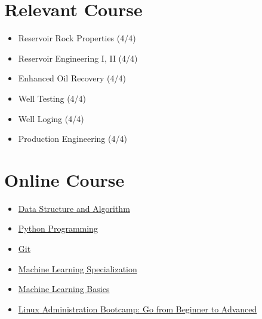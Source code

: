 \documentclass[a4paper, 11pt, sans]{article}
\newcommand*{\authorimg}[1]{%
	\raisebox{-.3\baselineskip}{%
		\texttt{[image: \#1]}%
	}%
}
\begin{document}
\section{Relevant Course}
	\begin{multicols}{3}
		\begin{itemize}[itemsep=-1pt, parsep=4pt]
			\item\small Reservoir Rock Properties (4/4)
			\item Reservoir Engineering I, II (4/4)
			\item Enhanced Oil Recovery (4/4)
			\item Well Testing (4/4)
			\item Well Loging (4/4)
			\item Production Engineering (4/4)
		\end{itemize}
	\end{multicols}


	
\section{Online Course}
\begin{multicols}{2}
	\begin{itemize}[itemsep=-1pt, parsep=4pt]
		\item\small \authorimg{images/ds-algorithm.png} \href{https://maktabkhooneh.org/course/189-%D8%B7%D8%B1%D8%A7%D8%AD%DB%8C-%D8%A7%D9%84%DA%AF%D9%88%D8%B1%DB%8C%D8%AA%D9%85-mk189/}{Data Structure and Algorithm}
		\item \authorimg{images/python.png} \href{https://www.pytopia.ai/course/python}{Python Programming}
		\item \authorimg{images/git.png} \href{https://www.pytopia.ai/course/git}{Git}
		\item \authorimg{images/ml.png} \href{https://www.coursera.org/specializations/machine-learning-introduction}{Machine Learning Specialization}
		\item \authorimg{images/ml-logo.png} \href{https://www.pytopia.ai/course/ml}{Machine Learning Basics}
		\item \authorimg{images/ubuntu.jpg} \href{https://www.udemy.com/course/linux-administration-bootcamp/}{Linux Administration Bootcamp: Go from Beginner to Advanced}
	\end{itemize}
\end{multicols}
\vspace*{2.0\multicolsep}
\end{document}
